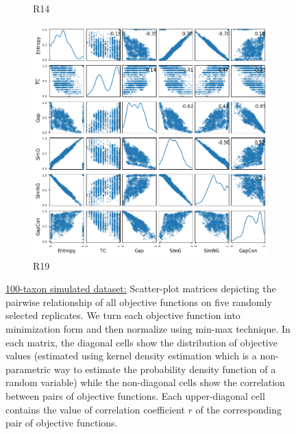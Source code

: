 \begin{figure}[!htbp]
\begin{adjustwidth}{-1cm}{-1cm}
\begin{subfigure}{0.35\textwidth}
			\caption{R14}
		\end{subfigure}
		\begin{subfigure}{0.35\textwidth}
			\includegraphics[width=\columnwidth]{Figure/6-obj-old/R19/fig/scatter_mattrix}
			\caption{R19}
		\end{subfigure}
		\caption{\underline{100-taxon simulated dataset:} Scatter-plot matrices depicting the pairwise relationship of all objective functions on five randomly selected replicates. We turn each objective function into minimization form and then normalize using min-max technique. In each matrix, the diagonal cells show the distribution of objective values (estimated using kernel density estimation which is a non-parametric way to estimate the probability density function of a random variable) while the non-diagonal cells show the correlation between pairs of objective functions. Each upper-diagonal cell contains the value of correlation coefficient $r$ of the corresponding pair of objective functions.}
		\label{fig:new_nature_obj}
	\end{adjustwidth}
\end{figure}
